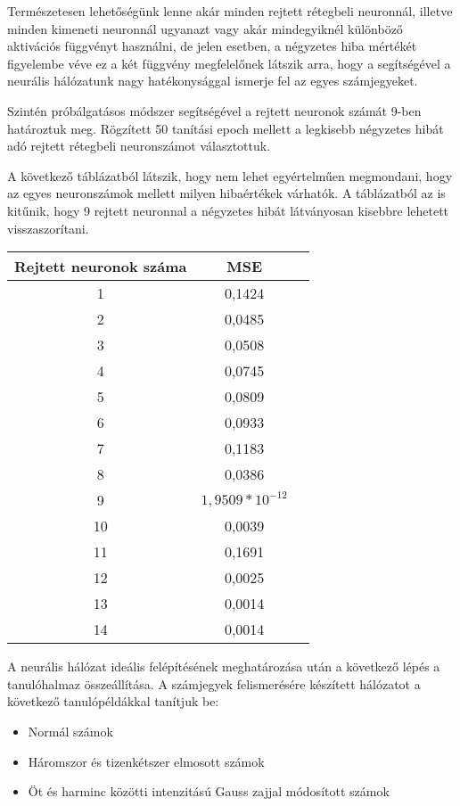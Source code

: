 Természetesen lehetőségünk lenne akár minden rejtett rétegbeli neuronnál, illetve minden kimeneti neuronnál ugyanazt vagy akár mindegyiknél különböző aktivációs függvényt használni, de jelen esetben, a négyzetes hiba mértékét figyelembe véve ez a két függvény megfelelőnek látszik arra, hogy a segítségével a neurális hálózatunk nagy hatékonysággal ismerje fel az egyes számjegyeket.

Szintén próbálgatásos módszer segítségével a rejtett neuronok számát 9-ben határoztuk meg. Rögzített 50 tanítási epoch mellett a legkisebb négyzetes hibát adó rejtett rétegbeli neuronszámot választottuk.

A következő táblázatból látszik, hogy nem lehet egyértelműen megmondani, hogy az egyes neuronszámok mellett milyen hibaértékek várhatók. A táblázatból az is kitűnik, hogy 9 rejtett neuronnal a négyzetes hibát látványosan kisebbre lehetett visszaszorítani. 

\begin{center}
\begin{tabular}{ |c|c|c| } 
 \hline
 Rejtett neuronok száma  & MSE  \\ 
 \hline\hline
 1 & 0,1424 \\
 \hline
 2 & 0,0485 \\
 \hline
 3 & 0,0508 \\
 \hline
 4 & 0,0745 \\
 \hline 
 5 & 0,0809 \\
 \hline
 6 & 0,0933 \\
 \hline
 7 & 0,1183 \\
 \hline 
 8 & 0,0386 \\
 \hline
 9 & $1,9509*10^{-12}$ \\
 \hline
 10 & 0,0039 \\
 \hline
 11 & 0,1691 \\
 \hline
 12 & 0,0025 \\
 \hline
 13 & 0,0014 \\
 \hline
 14 & 0,0014 \\
 \hline
\end{tabular}
\end{center} 

A neurális hálózat ideális felépítésének meghatározása után a következő lépés a tanulóhalmaz összeállítása. A számjegyek felismerésére készített hálózatot a következő tanulópéldákkal tanítjuk be: 

\begin{itemize}
\item Normál számok 
\item Háromszor és tizenkétszer elmosott számok 
\item Öt és harminc közötti intenzitású Gauss zajjal módosított számok
\end{itemize}

